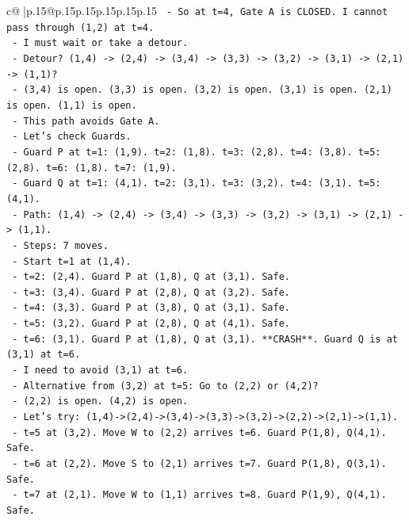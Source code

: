 \documentclass{article}
\begin{document}
{\begin{supertabular}{c@{$\;$}|p{.15\linewidth}@{}p{.15\linewidth}p{.15\linewidth}p{.15\linewidth}p{.15\linewidth}p{.15\linewidth}}
{{{\texttt{    {-} So at t=4, Gate A is CLOSED. I cannot pass through (1,2) at t=4.} \\
\texttt{    {-} I must wait or take a detour.} \\
\texttt{    {-} Detour? (1,4) {-}> (2,4) {-}> (3,4) {-}> (3,3) {-}> (3,2) {-}> (3,1) {-}> (2,1) {-}> (1,1)?} \\
\texttt{      {-} (3,4) is open. (3,3) is open. (3,2) is open. (3,1) is open. (2,1) is open. (1,1) is open.} \\
\texttt{      {-} This path avoids Gate A.} \\
\texttt{      {-} Let's check Guards.} \\
\texttt{      {-} Guard P at t=1: (1,9). t=2: (1,8). t=3: (2,8). t=4: (3,8). t=5: (2,8). t=6: (1,8). t=7: (1,9).} \\
\texttt{      {-} Guard Q at t=1: (4,1). t=2: (3,1). t=3: (3,2). t=4: (3,1). t=5: (4,1).} \\
\texttt{      {-} Path: (1,4) {-}> (2,4) {-}> (3,4) {-}> (3,3) {-}> (3,2) {-}> (3,1) {-}> (2,1) {-}> (1,1).} \\
\texttt{      {-} Steps: 7 moves.} \\
\texttt{      {-} Start t=1 at (1,4).} \\
\texttt{      {-} t=2: (2,4). Guard P at (1,8), Q at (3,1). Safe.} \\
\texttt{      {-} t=3: (3,4). Guard P at (2,8), Q at (3,2). Safe.} \\
\texttt{      {-} t=4: (3,3). Guard P at (3,8), Q at (3,1). Safe.} \\
\texttt{      {-} t=5: (3,2). Guard P at (2,8), Q at (4,1). Safe.} \\
\texttt{      {-} t=6: (3,1). Guard P at (1,8), Q at (3,1). **CRASH**. Guard Q is at (3,1) at t=6.} \\
\texttt{      {-} I need to avoid (3,1) at t=6.} \\
\texttt{      {-} Alternative from (3,2) at t=5: Go to (2,2) or (4,2)?} \\
\texttt{      {-} (2,2) is open. (4,2) is open.} \\
\texttt{      {-} Let's try: (1,4){-}>(2,4){-}>(3,4){-}>(3,3){-}>(3,2){-}>(2,2){-}>(2,1){-}>(1,1).} \\
\texttt{      {-} t=5 at (3,2). Move W to (2,2) arrives t=6. Guard P(1,8), Q(4,1). Safe.} \\
\texttt{      {-} t=6 at (2,2). Move S to (2,1) arrives t=7. Guard P(1,8), Q(3,1). Safe.} \\
\texttt{      {-} t=7 at (2,1). Move W to (1,1) arrives t=8. Guard P(1,9), Q(4,1). Safe.} \\
}}}
\end{supertabular}}
\end{document}
